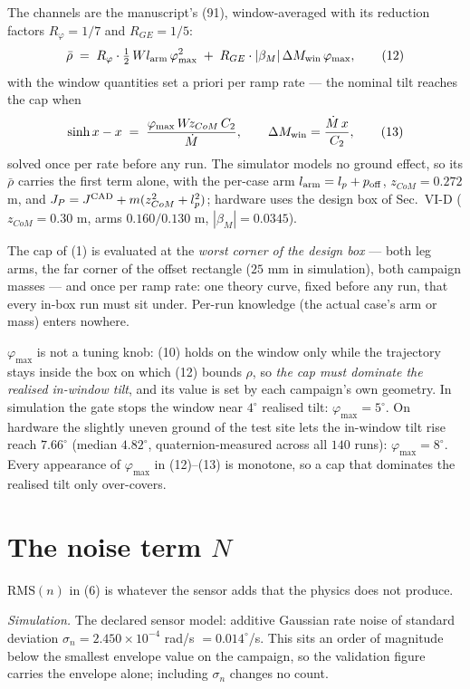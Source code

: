 \documentclass[10pt]{article}
\newcommand{\Mdot}{\dot M}
\newcommand{\rbar}{\bar\rho}
\newcommand{\rms}{\mathrm{RMS}}
\newcommand{\Wz}{W\!z_{CoM}}
\begin{document}
The channels are the manuscript's (91), window-averaged with its
reduction factors $R_\varphi = 1/7$ and $R_{GE} = 1/5$:
\begin{equation}
  \rbar \;=\;
  R_\varphi\cdot\tfrac12\,W l_{\rm arm}\,\varphi_{\max}^2
  \;+\;
  R_{GE}\cdot|\beta_M|\,\Delta M_{\rm win}\,\varphi_{\max},
  \tag{12}
\end{equation}
with the window quantities set a priori per ramp rate --- the nominal
tilt reaches the cap when
\begin{equation}
  \sinh x - x \;=\; \frac{\varphi_{\max}\,\Wz\,C_2}{\Mdot},
  \qquad
  \Delta M_{\rm win} = \frac{\Mdot\,x}{C_2},
  \tag{13}
\end{equation}
solved once per rate before any run. The simulator models no ground
effect, so its $\rbar$ carries the first term alone, with the
per-case arm $l_{\rm arm} = l_p + p_{\rm off}$, $z_{CoM} = 0.272$ m,
and $J_P = J^{\rm CAD} + m(z_{CoM}^2 + l_p^2)$; hardware uses the
design box of Sec.~VI-D ($z_{CoM} = 0.30$ m, arms $0.160/0.130$ m,
$|\beta_M| = 0.0345$).

The cap of (1) is evaluated at the \emph{worst corner of the design
box} --- both leg arms, the far corner of the offset rectangle
($25$ mm in simulation), both campaign masses --- and once per ramp
rate: one theory curve, fixed before any run, that every in-box run
must sit under. Per-run knowledge (the actual case's arm or mass)
enters nowhere.

$\varphi_{\max}$ is not a tuning knob: (10) holds on the window only
while the trajectory stays inside the box on which (12) bounds
$\rho$, so \emph{the cap must dominate the realised in-window tilt},
and its value is set by each campaign's own geometry. In simulation
the gate stops the window near $4^\circ$ realised tilt:
$\varphi_{\max} = 5^\circ$. On hardware the slightly uneven ground of
the test site lets the in-window tilt rise reach $7.66^\circ$
(median $4.82^\circ$, quaternion-measured across all $140$ runs):
$\varphi_{\max} = 8^\circ$. Every appearance of $\varphi_{\max}$ in
(12)--(13) is monotone, so a cap that dominates the realised tilt
only over-covers.

\section{The noise term $N$}

$\rms(n)$ in (6) is whatever the sensor adds that the physics does
not produce.

\emph{Simulation.} The declared sensor model: additive Gaussian rate
noise of standard deviation $\sigma_n = 2.450\times10^{-4}$ rad/s
$= 0.014^\circ$/s. This sits an order of magnitude below the
smallest envelope value on the campaign, so the validation figure
carries the envelope alone; including $\sigma_n$ changes no count.
\end{document}

